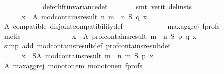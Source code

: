 \begin{isabellebody}
\ \ \ \ \ \ \ \ \ \ \ \ defer{\isacharunderscore}{\kern0pt}lift{\isacharunderscore}{\kern0pt}invariance{\isacharunderscore}{\kern0pt}def\isanewline
\ \ \ \ \ \ \isamarkupfalse%
\ {\isacharparenleft}{\kern0pt}smt\ {\isacharparenleft}{\kern0pt}verit{\isacharcomma}{\kern0pt}\ del{\isacharunderscore}{\kern0pt}insts{\isacharparenright}{\kern0pt}{\isacharparenright}{\kern0pt}\isanewline
\ \ \ \ \isamarkupfalse%
\ \isamarkupfalse%
\isanewline
\ \ \ \ \ \ {\isachardoublequoteopen}{\isasymforall}x\ {\isasymin}\ A{\isachardot}{\kern0pt}\ mod{\isacharunderscore}{\kern0pt}contains{\isacharunderscore}{\kern0pt}result\ n\ {\isacharparenleft}{\kern0pt}m\ {\isasymparallel}\isactrlsub {\isasymup}\ n{\isacharparenright}{\kern0pt}\ S\ q\ x{\isachardoublequoteclose}\isanewline
\ \ \ \ \ \ \isamarkupfalse%
\ A\ compatible\ disjoint{\isacharunderscore}{\kern0pt}compatibility{\isacharunderscore}{\kern0pt}def\isanewline
\ \ \ \ \ \ \ \ \ \ \ \ max{\isacharunderscore}{\kern0pt}agg{\isacharunderscore}{\kern0pt}rej{}\ f{\isacharunderscore}{\kern0pt}profs\isanewline
\ \ \ \ \ \ \isamarkupfalse%
\ metis\isanewline
\ \ \ \ \isamarkupfalse%
\ \isamarkupfalse%
\ {}{}{\isacharcolon}{\kern0pt}\isanewline
\ \ \ \ \ \ {\isachardoublequoteopen}{\isasymforall}x\ {\isasymin}\ A{\isachardot}{\kern0pt}\ prof{\isacharunderscore}{\kern0pt}contains{\isacharunderscore}{\kern0pt}result\ {\isacharparenleft}{\kern0pt}m\ {\isasymparallel}\isactrlsub {\isasymup}\ n{\isacharparenright}{\kern0pt}\ S\ p\ q\ x{\isachardoublequoteclose}\isanewline
\ \ \ \ \ \ \isamarkupfalse%
\ {\isacharparenleft}{\kern0pt}simp\ add{\isacharcolon}{\kern0pt}\ mod{\isacharunderscore}{\kern0pt}contains{\isacharunderscore}{\kern0pt}result{\isacharunderscore}{\kern0pt}def\ prof{\isacharunderscore}{\kern0pt}contains{\isacharunderscore}{\kern0pt}result{\isacharunderscore}{\kern0pt}def{\isacharparenright}{\kern0pt}\isanewline
\ \ \ \ \isamarkupfalse%
\isanewline
\ \ \ \ \ \ {\isachardoublequoteopen}{\isasymforall}x\ {\isasymin}\ S{\isacharminus}{\kern0pt}A{\isachardot}{\kern0pt}\ mod{\isacharunderscore}{\kern0pt}contains{\isacharunderscore}{\kern0pt}result\ {\isacharparenleft}{\kern0pt}m\ {\isasymparallel}\isactrlsub {\isasymup}\ n{\isacharparenright}{\kern0pt}\ m\ S\ p\ x{\isachardoublequoteclose}\isanewline
\ \ \ \ \ \ \isamarkupfalse%
\ A\ max{\isacharunderscore}{\kern0pt}agg{\isacharunderscore}{\kern0pt}rej{}\ monotone{\isacharunderscore}{\kern0pt}m\ monotone{\isacharunderscore}{\kern0pt}n\ f{\isacharunderscore}{\kern0pt}profs\isanewline

\end{isabellebody}
